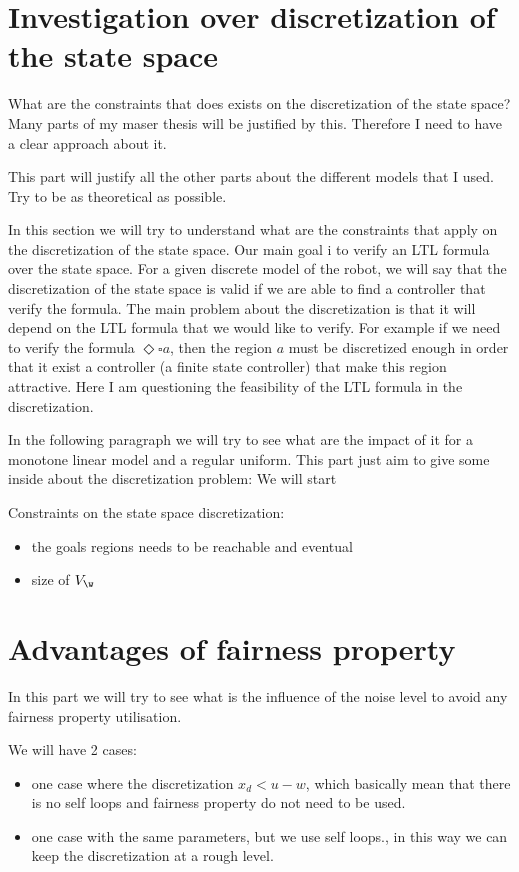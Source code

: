\section{Investigation over discretization of the state space}
What are the constraints that does exists on the discretization of the state space?
Many parts of my maser thesis will be justified by this.
Therefore I need to have a clear approach about it.

This part will justify all the other parts about the different models that I used.
Try to be as theoretical as possible.
 

In this section we will try to understand what are the constraints that apply on the discretization of the state space.
Our main goal i to verify an LTL formula over the state space. For a given discrete model of the robot, we will say that the discretization of the state space is valid if we are able to find a controller that verify the formula.
The main problem about the discretization is that it will depend on the LTL formula that we would like to verify. For example if we need to verify the formula $\Diamond \square a$, then the region $a$ must be discretized enough in order that it exist a controller (a finite state controller) that make this region attractive.
Here I am questioning the feasibility of the LTL formula in the discretization.

In the following paragraph we will try to see what are the impact of it for a monotone linear model and a regular uniform.
This part just aim to give some inside about the discretization problem:
We will start

Constraints on the state space discretization:
\begin{itemize}[noitemsep,nolistsep,topsep=0pt,parsep=0pt,partopsep=0pt]
\item the goals regions needs to be reachable and eventual
\item size of $V_\w$
\end{itemize}

\section{Advantages of fairness property}

In this part we will try to see what is the influence of the noise level to avoid any fairness property utilisation.

We will have 2 cases:
\begin{itemize}[noitemsep,topsep=0pt,parsep=0pt,partopsep=0pt]
\item one case where the discretization $x_d<u-w$, which basically mean that there is no self loops and fairness property do not need to be used.
\item one case  with the same parameters, but we use self loops., in this way we can keep the discretization at a rough level.
\end{itemize}

